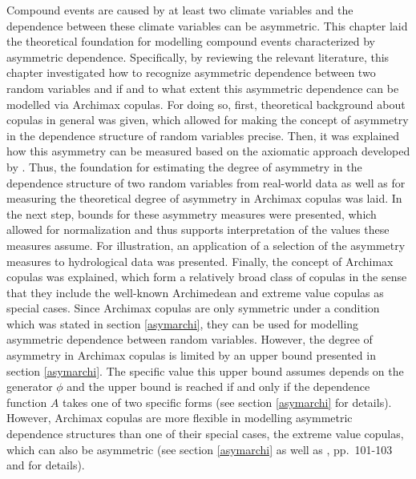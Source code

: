 \documentclass[
]{krantz}
\begin{document}
Compound events are caused by at least two climate variables and the dependence between these climate variables can be asymmetric. This chapter laid the theoretical foundation for modelling compound events characterized by asymmetric dependence. Specifically, by reviewing the relevant literature, this chapter investigated how to recognize asymmetric dependence between two random variables and if and to what extent this asymmetric dependence can be modelled via Archimax copulas. For doing so, first, theoretical background about copulas in general was given, which allowed for making the concept of asymmetry in the dependence structure of random variables precise. Then, it was explained how this asymmetry can be measured based on the axiomatic approach developed by \citet{durante2010a}. Thus, the foundation for estimating the degree of asymmetry in the dependence structure of two random variables from real-world data as well as for measuring the theoretical degree of asymmetry in Archimax copulas was laid. In the next step, bounds for these asymmetry measures were presented, which allowed for normalization and thus supports interpretation of the values these measures assume. For illustration, an application of a selection of the asymmetry measures to hydrological data was presented. Finally, the concept of Archimax copulas was explained, which form a relatively broad class of copulas in the sense that they include the well-known Archimedean and extreme value copulas as special cases. Since Archimax copulas are only symmetric under a condition which was stated in section \ref{asymarchi}, they can be used for modelling asymmetric dependence between random variables. However, the degree of asymmetry in Archimax copulas is limited by an upper bound presented in section \ref{asymarchi}. The specific value this upper bound assumes depends on the generator \(\phi\) and the upper bound is reached if and only if the dependence function \(A\) takes one of two specific forms (see section \ref{asymarchi} for details). However, Archimax copulas are more flexible in modelling asymmetric dependence structures than one of their special cases, the extreme value copulas, which can also be asymmetric (see section \ref{asymarchi} as well as \citet{genest2013}, pp.~101-103 and \citet{durante2010b} for details).
\end{document}
